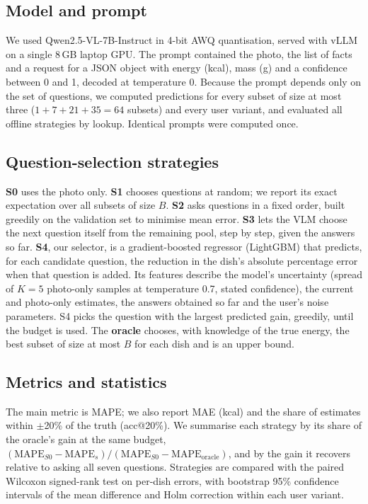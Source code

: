 \documentclass[twocolumn]{svjour3}
\begin{document}
\subsection{Model and prompt}
We used Qwen2.5-VL-7B-Instruct in 4-bit AWQ quantisation, served with vLLM on a single 8\,GB laptop GPU.
The prompt contained the photo, the list of facts and a request for a JSON object with energy (kcal), mass
(g) and a confidence between 0 and 1, decoded at temperature 0. Because the prompt depends only on the set
of questions, we computed predictions for every subset of size at most three ($1+7+21+35=64$ subsets) and
every user variant, and evaluated all offline strategies by lookup. Identical prompts were computed once.

\subsection{Question-selection strategies}
\textbf{S0} uses the photo only. \textbf{S1} chooses questions at random; we report its exact expectation
over all subsets of size $B$. \textbf{S2} asks questions in a fixed order, built greedily on the validation
set to minimise mean error. \textbf{S3} lets the VLM choose the next question itself from the remaining
pool, step by step, given the answers so far. \textbf{S4}, our selector, is a gradient-boosted regressor
(LightGBM) that predicts, for each candidate question, the reduction in the dish's absolute percentage error
when that question is added. Its features describe the model's uncertainty (spread of $K=5$ photo-only
samples at temperature 0.7, stated confidence), the current and photo-only estimates, the answers obtained
so far and the user's noise parameters. S4 picks the question with the largest predicted gain, greedily,
until the budget is used. The \textbf{oracle} chooses, with knowledge of the true energy, the best subset of
size at most $B$ for each dish and is an upper bound.

\subsection{Metrics and statistics}
The main metric is MAPE; we also report MAE (kcal) and the share of estimates within $\pm$20\% of the
truth (acc@20\%). We summarise each strategy by its share of the oracle's gain at the same budget,
$(\mathrm{MAPE}_{S0}-\mathrm{MAPE}_{s})/(\mathrm{MAPE}_{S0}-\mathrm{MAPE}_{\mathrm{oracle}})$, and by the gain
it recovers relative to asking all seven questions. Strategies are compared with the paired Wilcoxon
signed-rank test on per-dish errors, with bootstrap 95\% confidence intervals of the mean difference and
Holm correction within each user variant.
\end{document}
